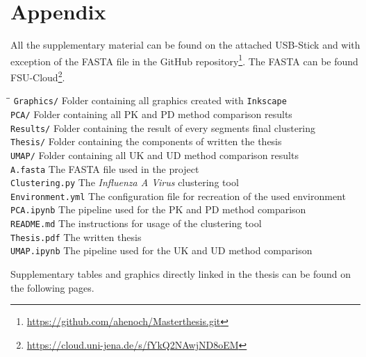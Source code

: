 \chapter{Appendix}  \label{chap:Appendix}

All the supplementary material can be found on the attached USB-Stick and with exception of the FASTA file in the GitHub repository\footnote{\url{https://github.com/ahenoch/Masterthesis.git}}. The FASTA can be found FSU-Cloud\footnote{\url{https://cloud.uni-jena.de/s/fYkQ2NAwjND8oEM}}.

\begin{tabbing}
    \hspace{4cm}\=\=\kill
    \texttt{Graphics/} \> Folder containing all graphics created with \texttt{Inkscape}\\
    \texttt{PCA/} \> Folder containing all PK and PD method comparison results\\
    \texttt{Results/} \> Folder containing the result of every segments final clustering\\
    \texttt{Thesis/} \> Folder containing the components of written the thesis\\
    \texttt{UMAP/} \> Folder containing all UK and UD method comparison results\\
    \texttt{A.fasta} \> The FASTA file used in the project\\
    \texttt{Clustering.py} \> The \textit{Influenza A Virus} clustering tool\\
    \texttt{Environment.yml} \> The configuration file for recreation of the used environment\\
    \texttt{PCA.ipynb} \> The pipeline used for the PK and PD method comparison\\
    \texttt{README.md} \> The instructions for usage of the clustering tool\\
    \texttt{Thesis.pdf} \> The written thesis\\
    \texttt{UMAP.ipynb} \> The pipeline used for the UK and UD method comparison\\
\end{tabbing}

Supplementary tables and graphics directly linked in the thesis can be found on the following pages.

